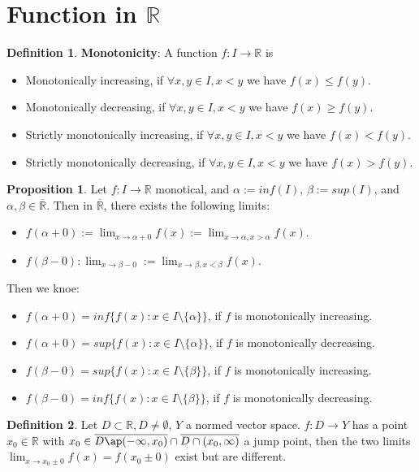 \documentclass{article}
\theoremstyle{definition}
\newtheorem{defi}{Definition}[subsection]
\newtheorem{prop}{Proposition}[subsection]
\begin{document}
\section{Function in $\mathbb{R}$}
\begin{defi}
\textbf{Monotonicity}: A function $f: I \to \mathbb{R}$ is
\begin{itemize}
    \item Monotonically increasing, if $\forall x,y \in I, x<y  $ we have $f(x)\leq f(y)$.
    \item Monotonically decreasing, if $\forall x,y \in I, x<y  $ we have $f(x)\geq f(y)$.
    \item Strictly monotonically increasing, if $\forall x,y \in I, x<y  $ we have $f(x)<f(y)$.
    \item Strictly monotonically decreasing, if $\forall x,y \in I, x<y  $ we have $f(x)>f(y)$.
\end{itemize}
\end{defi}
\begin{prop}
Let $f: I\to\mathbb{R}$ monotical, and $\alpha := inf(I)$, $\beta:=sup(I)$, and $\alpha, \beta \in \overline{\mathbb{R}}$. Then in $\overline{\mathbb{R}}$, there exists the following limits:
\begin{itemize}
    \item $f(\alpha+0):= \lim_{x\to \alpha+0}f(x):= \lim_{x\to \alpha, x>\alpha} f(x)$.
    \item $f(\beta-0):\lim_{x\to\beta-0}:= \lim_{x\to\beta, x<\beta}f(x)$.
\end{itemize}
Then we knoe:
\begin{itemize}
    \item $f(\alpha+0)=inf\{f(x): x\in I \texttt{\textbackslash}\{\alpha\}\}$, if $f$ is monotonically increasing.
    \item $f(\alpha+0)=sup\{f(x): x\in I \texttt{\textbackslash}\{\alpha\}\}$, if $f$ is monotonically decreasing.
    \item $f(\beta-0)=sup\{f(x): x\in I \texttt{\textbackslash}\{\beta\}\}$, if $f$ is monotonically increasing.
    \item $f(\beta-0)=inf\{f(x): x\in I \texttt{\textbackslash}\{\beta\}\}$, if $f$ is monotonically decreasing.
\end{itemize}
\end{prop}
\begin{defi}
Let $D\subset \mathbb{R}, D\neq \emptyset$, $Y$ a normed vector space. $f: D\to Y$ has a point $x_0\in \mathbb{R}$ with $x_0\in \overline{D\ap (-\infty, x_0)}\cap \overline{D\cap(x_0, \infty)}$ a jump point, then the two limits $\lim_{x\to x_0 \pm 0}f(x)= f(x_0\pm 0)$ exist but are different.
\end{defi}
\end{document}
